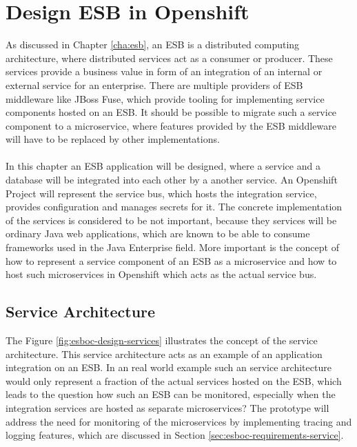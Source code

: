 \chapter{Design ESB in Openshift}
\label{cha:esboc}
As discussed in Chapter \vref{cha:esb}, an ESB is a distributed computing architecture, where distributed services act as a consumer or producer. These services provide a business value in form of an integration of an internal or external service for an enterprise. There are multiple providers of ESB middleware like JBoss Fuse, which provide tooling for implementing service components hosted on an ESB. It should be possible to migrate such a service component to a microservice, where features provided by the ESB middleware will have to be replaced by other implementations.
\\ \\
In this chapter an ESB application will be designed, where a service and a database will be integrated into each other by a another service. An Openshift Project will represent the service bus, which hosts the integration service, provides configuration and manages secrets for it. The concrete implementation of the services is considered to be not important, because they services will be ordinary Java web applications, which are known to be able to consume frameworks used in the Java Enterprise field. More important is the concept of how to represent a service component of an ESB as a microservice and how to host such microservices in Openshift which acts as the actual service bus.

\section{Service Architecture}
The Figure \vref{fig:esboc-design-services} illustrates the concept of the service architecture. This service architecture acts as an example of an application integration on an ESB. In an real world example such an service architecture would only represent a fraction of the actual services hosted on the ESB, which leads to the question how such an ESB can be monitored, especially when the integration services are hosted as separate microservices? The prototype will address the need for monitoring of the microservices by implementing tracing and logging features, which are discussed in Section \vref{sec:esboc-requirements-service}.

